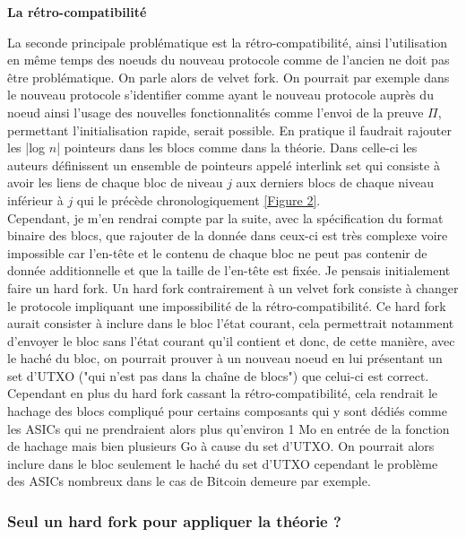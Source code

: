 \documentclass[12pt,a4paper]{article}
\newcommand{\annexe}[2]{\hyperlink{#1}{[Figure #2]}}
\begin{document}
	\textbf{La rétro-compatibilité\\}
	
	La seconde principale problématique est la rétro-compatibilité, ainsi l'utilisation en même temps des noeuds du nouveau protocole comme de l'ancien ne doit pas être problématique. On parle alors de velvet fork. On pourrait par exemple dans le nouveau protocole s'identifier comme ayant le nouveau protocole auprès du noeud ainsi l'usage des nouvelles fonctionnalités comme l'envoi de la preuve $\Pi$, permettant l'initialisation rapide, serait possible. En pratique il faudrait rajouter les |log $n$| pointeurs dans les blocs comme dans la théorie. Dans celle-ci les auteurs définissent un ensemble de pointeurs appelé interlink set qui consiste à avoir les liens de chaque bloc de niveau $j$ aux derniers blocs de chaque niveau inférieur à $j$ qui le précède chronologiquement \annexe{22}{2}.\\ %
	Cependant, je m'en rendrai compte par la suite, avec la spécification du format binaire des blocs, que rajouter de la donnée dans ceux-ci est très complexe voire impossible car l'en-tête et le contenu de chaque bloc ne peut pas contenir de donnée additionnelle et que la taille de l'en-tête est fixée. Je pensais initialement faire un hard fork. Un hard fork contrairement à un velvet fork consiste à changer le protocole impliquant une impossibilité de la rétro-compatibilité. Ce hard fork aurait consister à inclure dans le bloc l'état courant, cela permettrait notamment d'envoyer le bloc sans l'état courant qu'il contient et donc, de cette manière, avec le haché du bloc, on pourrait prouver à un nouveau noeud en lui présentant un set d'UTXO ("qui n'est pas dans la chaîne de blocs") que celui-ci est correct. Cependant en plus du hard fork cassant la rétro-compatibilité, cela rendrait le hachage des blocs compliqué pour certains composants qui y sont dédiés comme les ASICs qui ne prendraient alors plus qu'environ 1 Mo en entrée de la fonction de hachage mais bien plusieurs Go à cause du set d'UTXO. %
	On pourrait alors inclure dans le bloc seulement le haché du set d'UTXO cependant le problème des ASICs nombreux dans le cas de Bitcoin demeure par exemple.
	
	\subsubsection{Seul un hard fork pour appliquer la théorie ?}
	
\end{document}
